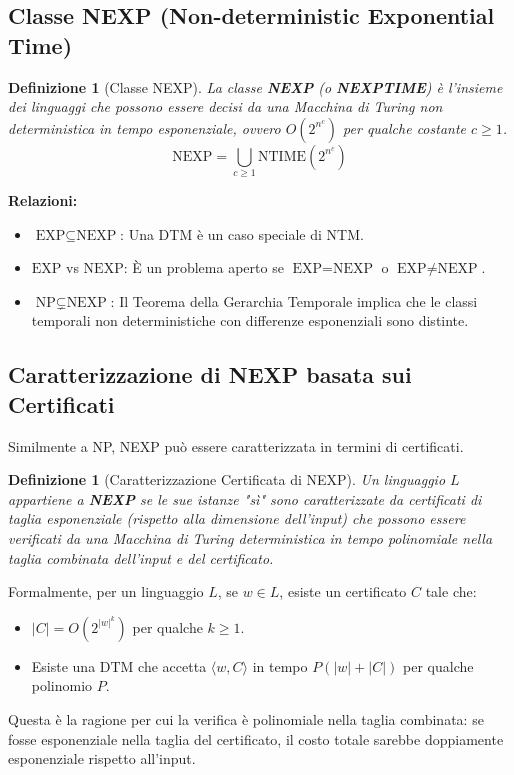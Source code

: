 \documentclass[a4paper, 11pt]{book} %
\newtheorem{definition}[theorem]{Definizione}
\theoremstyle{definition}
\begin{document}
\subsection{Classe NEXP (Non-deterministic Exponential Time)}
\begin{definition}[Classe NEXP]
La classe \textbf{NEXP} (o \textbf{NEXPTIME}) è l'insieme dei linguaggi che possono essere decisi da una Macchina di Turing non deterministica in tempo esponenziale, ovvero $O(2^{n^c})$ per qualche costante $c \ge 1$.
\[
\text{NEXP} = \bigcup_{c \ge 1} \text{NTIME}(2^{n^c})
\]
\end{definition}

\textbf{Relazioni:}
\begin{itemize}
    \item $\text{EXP} \subseteq \text{NEXP}$: Una DTM è un caso speciale di NTM.
    \item $\text{EXP}$ vs $\text{NEXP}$: È un problema aperto se $\text{EXP} = \text{NEXP}$ o $\text{EXP} \neq \text{NEXP}$.
    \item $\text{NP} \subsetneq \text{NEXP}$: Il Teorema della Gerarchia Temporale implica che le classi temporali non deterministiche con differenze esponenziali sono distinte.
\end{itemize}

\subsection{Caratterizzazione di NEXP basata sui Certificati}
Similmente a NP, NEXP può essere caratterizzata in termini di certificati.
\begin{definition}[Caratterizzazione Certificata di NEXP]
Un linguaggio $L$ appartiene a \textbf{NEXP} se le sue istanze "sì" sono caratterizzate da certificati di \textit{taglia esponenziale} (rispetto alla dimensione dell'input) che possono essere verificati da una Macchina di Turing deterministica in \textit{tempo polinomiale} nella taglia combinata dell'input e del certificato.
\end{definition}
Formalmente, per un linguaggio $L$, se $w \in L$, esiste un certificato $C$ tale che:
\begin{itemize}
    \item $|C| = O(2^{|w|^k})$ per qualche $k \ge 1$.
    \item Esiste una DTM che accetta $\langle w, C \rangle$ in tempo $P(|w| + |C|)$ per qualche polinomio $P$.
\end{itemize}
Questa è la ragione per cui la verifica è polinomiale nella taglia combinata: se fosse esponenziale nella taglia del certificato, il costo totale sarebbe doppiamente esponenziale rispetto all'input.
\end{document}
